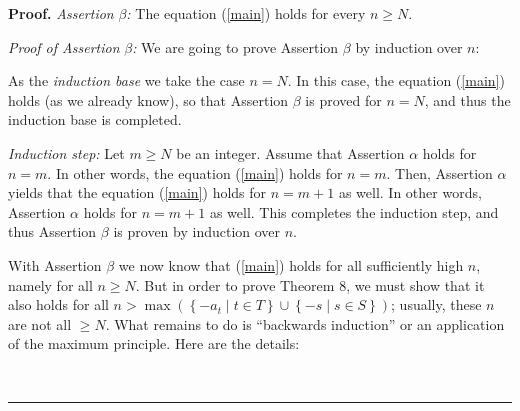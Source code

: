 \documentclass[numbers=enddot,12pt,final,onecolumn,notitlepage]{scrartcl}%
\numberwithin{exer}{section}
\theoremstyle{definition}
\newenvironment{proof}[1][Proof]{\noindent\textbf{#1.} }{\ \rule{0.5em}{0.5em}}
\begin{document}
\begin{proof}
\textit{Assertion }$\beta$\textit{:} The equation (\ref{main}) holds for every
$n\geq N$.

\textit{Proof of Assertion }$\beta$\textit{:} We are going to prove Assertion
$\beta$ by induction over $n$:

As the \textit{induction base} we take the case $n=N$. In this case, the
equation (\ref{main}) holds (as we already know), so that Assertion $\beta$ is
proved for $n=N$, and thus the induction base is completed.

\textit{Induction step:} Let $m\geq N$ be an integer. Assume that Assertion
$\alpha$ holds for $n=m$. In other words, the equation (\ref{main}) holds for
$n=m$. Then, Assertion $\alpha$ yields that the equation (\ref{main}) holds
for $n=m+1$ as well. In other words, Assertion $\alpha$ holds for $n=m+1$ as
well. This completes the induction step, and thus Assertion $\beta$ is proven
by induction over $n$.

With Assertion $\beta$ we now know that (\ref{main}) holds for all
sufficiently high $n$, namely for all $n\geq N$. But in order to prove Theorem
8, we must show that it also holds for all $n>\max\left(  \left\{  -a_{t}\mid
t\in T\right\}  \cup\left\{  -s\mid s\in S\right\}  \right)  $; usually, these
$n$ are not all $\geq N$. What remains to do is ``backwards induction'' or an
application of the maximum principle. Here are the details:


\end{proof}
\end{document}
